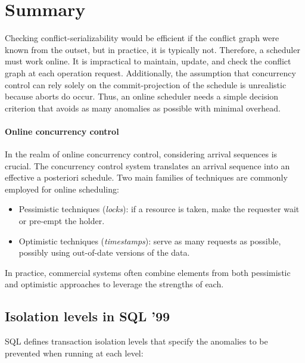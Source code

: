 \section{Summary}

Checking conflict-serializability would be efficient if the conflict graph were known from the outset, but in practice, it is typically not.
Therefore, a scheduler must work online. 
It is impractical to maintain, update, and check the conflict graph at each operation request. 
Additionally, the assumption that concurrency control can rely solely on the commit-projection of the schedule is unrealistic because aborts do occur.
Thus, an online scheduler needs a simple decision criterion that avoids as many anomalies as possible with minimal overhead.

\paragraph*{Online concurrency control}
In the realm of online concurrency control, considering arrival sequences is crucial.
The concurrency control system translates an arrival sequence into an effective a posteriori schedule.
Two main families of techniques are commonly employed for online scheduling:
\begin{itemize}
    \item Pessimistic techniques (\textit{locks}): if a resource is taken, make the requester wait or pre-empt the holder.
    \item Optimistic techniques (\textit{timestamps}): serve as many requests as possible, possibly using out-of-date versions of the data. 
\end{itemize}
In practice, commercial systems often combine elements from both pessimistic and optimistic approaches to leverage the strengths of each.

\subsection{Isolation levels in SQL '99}
SQL defines transaction isolation levels that specify the anomalies to be prevented when running at each level:

